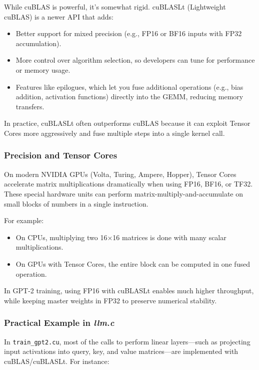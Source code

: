 \documentclass[
  letterpaper,
  DIV=11,
  numbers=noendperiod]{scrreprt}
\providecommand{\tightlist}{%
  \setlength{\itemsep}{0pt}\setlength{\parskip}{0pt}}
\begin{document}
While cuBLAS is powerful, it's somewhat rigid. cuBLASLt (Lightweight
cuBLAS) is a newer API that adds:

\begin{itemize}
\tightlist
\item
  Better support for mixed precision (e.g., FP16 or BF16 inputs with
  FP32 accumulation).
\item
  More control over algorithm selection, so developers can tune for
  performance or memory usage.
\item
  Features like epilogues, which let you fuse additional operations
  (e.g., bias addition, activation functions) directly into the GEMM,
  reducing memory transfers.
\end{itemize}

In practice, cuBLASLt often outperforms cuBLAS because it can exploit
Tensor Cores more aggressively and fuse multiple steps into a single
kernel call.

\subsubsection{Precision and Tensor
Cores}\label{precision-and-tensor-cores}

On modern NVIDIA GPUs (Volta, Turing, Ampere, Hopper), Tensor Cores
accelerate matrix multiplications dramatically when using FP16, BF16, or
TF32. These special hardware units can perform
matrix-multiply-and-accumulate on small blocks of numbers in a single
instruction.

For example:

\begin{itemize}
\tightlist
\item
  On CPUs, multiplying two 16×16 matrices is done with many scalar
  multiplications.
\item
  On GPUs with Tensor Cores, the entire block can be computed in one
  fused operation.
\end{itemize}

In GPT-2 training, using FP16 with cuBLASLt enables much higher
throughput, while keeping master weights in FP32 to preserve numerical
stability.

\subsubsection{\texorpdfstring{Practical Example in
\emph{llm.c}}{Practical Example in llm.c}}\label{practical-example-in-llm.c}

In \texttt{train\_gpt2.cu}, most of the calls to perform linear
layers---such as projecting input activations into query, key, and value
matrices---are implemented with cuBLAS/cuBLASLt. For instance:
\end{document}
